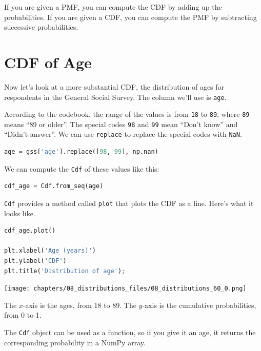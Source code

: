 If you are given a PMF, you can compute the CDF by adding up the
probabilities. If you are given a CDF, you can compute the PMF by
subtracting successive probabilities.

\hypertarget{cdf-of-age}{%
\section{CDF of Age}\label{cdf-of-age}}

Now let's look at a more substantial CDF, the distribution of ages for
respondents in the General Social Survey. The column we'll use is
\passthrough{\lstinline!age!}.

According to the codebook, the range of the values is from
\passthrough{\lstinline!18!} to \passthrough{\lstinline!89!}, where
\passthrough{\lstinline!89!} means ``89 or older''. The special codes
\passthrough{\lstinline!98!} and \passthrough{\lstinline!99!} mean
``Don't know'' and ``Didn't answer''. We can use
\passthrough{\lstinline!replace!} to replace the special codes with
\passthrough{\lstinline!NaN!}.

\begin{lstlisting}[language=Python,style=source]
age = gss['age'].replace([98, 99], np.nan)
\end{lstlisting}

We can compute the \passthrough{\lstinline!Cdf!} of these values like
this:

\begin{lstlisting}[language=Python,style=source]
cdf_age = Cdf.from_seq(age)
\end{lstlisting}

\passthrough{\lstinline!Cdf!} provides a method called
\passthrough{\lstinline!plot!} that plots the CDF as a line. Here's what
it looks like.

\begin{lstlisting}[language=Python,style=source]
cdf_age.plot()

plt.xlabel('Age (years)')
plt.ylabel('CDF')
plt.title('Distribution of age');
\end{lstlisting}

\begin{center}
\texttt{[image: chapters/08\_distributions\_files/08\_distributions\_60\_0.png]}
\end{center}

The \(x\)-axis is the ages, from 18 to 89. The \(y\)-axis is the
cumulative probabilities, from 0 to 1.

The \passthrough{\lstinline!Cdf!} object can be used as a function, so
if you give it an age, it returns the corresponding probability in a
NumPy array.

